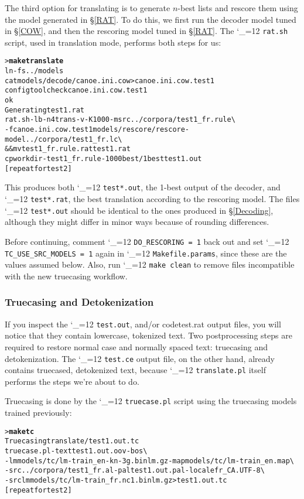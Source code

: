 \documentclass[11pt,letterpaper]{article}
\newcommand{\bs}{\textbackslash{}}
\def\code{\begingroup\catcode`\_=12 \codex}
\newcommand{\codex}[1]{\texttt{#1}\endgroup}
\begin{document}
The third option for translating is to generate $n$-best lists and rescore
them using the model generated in \S\ref{RAT}. To do this, we first run
the decoder model tuned in \S\ref{COW}, and then the rescoring model
tuned in \S\ref{RAT}.  The \code{rat.sh} script, used in translation
mode, performs both steps for us:
\begin{small}
\begin{alltt}
   > \textbf{make translate}
   ln -fs ../models
   cat models/decode/canoe.ini.cow > canoe.ini.cow.test1
   configtool check canoe.ini.cow.test1
   ok
   Generating test1.rat
   rat.sh -lb -n 4 trans -v -K 1000 -msrc ../corpora/test1_fr.rule \bs
      -f canoe.ini.cow.test1 models/rescore/rescore-model ../corpora/test1_fr.lc \bs
      && mv test1_fr.rule.rat test1.rat
   cp workdir-test1_fr.rule-1000best/1best test1.out
   [repeat for test2]
\end{alltt}
\end{small}
This produces both \code{test*.out}, the 1-best output of the decoder, and
\code{test*.rat}, the best translation according to the rescoring model.  The
files \code{test*.out} should be identical to the ones produced in
\S\ref{Decoding}, although they might differ in minor ways because of
rounding differences.

Before continuing, comment \code{DO_RESCORING = 1} back out and set
\code{TC_USE_SRC_MODELS = 1} again in \code{Makefile.params}, since these are
the values assumed below.  Also, run \code{make clean} to remove files
incompatible with the new truecasing workflow.

\subsubsection{Truecasing and Detokenization} \label{Truecasing}

If you inspect the \code{test.out}, and/or code{test.rat} output files, you will
notice that they contain lowercase, tokenized text.  Two postprocessing steps
are required to restore normal case and normally spaced text: truecasing and
detokenization.  The \code{test.ce} output file, on the other hand, already
contains truecased, detokenized text, because \code{translate.pl} itself
performs the steps we're about to do.

Truecasing is done by the \code{truecase.pl} script using the truecasing models
trained previously:
\begin{small}
\begin{alltt}
   > \textbf{make tc}
   Truecasing translate/test1.out.tc
   truecase.pl -text test1.out.oov -bos \bs
      -lm models/tc/lm-train_en-kn-3g.binlm.gz -map models/tc/lm-train_en.map \bs
      -src ../corpora/test1_fr.al -pal test1.out.pal -locale fr_CA.UTF-8 \bs
      -srclm models/tc/lm-train_fr.nc1.binlm.gz > test1.out.tc
   [repeat for test2]
\end{alltt}
\end{small}
\end{document}
